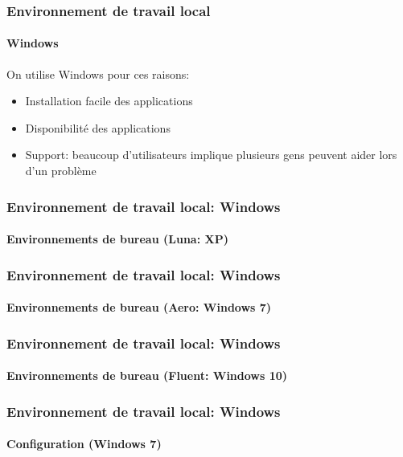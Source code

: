\documentclass[xcolor=table]{beamer}
\begin{document}
\begin{frame}
\frametitle{Environnement de travail local}
\framesubtitle{Windows}

On utilise Windows pour ces raisons:
\begin{itemize}
	\item Installation facile des applications
	\item Disponibilité des applications 
	\item Support: beaucoup d'utilisateurs implique plusieurs gens peuvent aider lors d'un problème
\end{itemize}

\end{frame}

\begin{frame}
\frametitle{Environnement de travail local: Windows}
\framesubtitle{Environnements de bureau (Luna: XP)}

\begin{center}
\end{center}

\end{frame}

\begin{frame}
\frametitle{Environnement de travail local: Windows}
\framesubtitle{Environnements de bureau (Aero: Windows 7)}

\begin{center}
\end{center}

\end{frame}

\begin{frame}
\frametitle{Environnement de travail local: Windows}
\framesubtitle{Environnements de bureau (Fluent: Windows 10)}

\begin{center}
\end{center}

\end{frame}

\begin{frame}
\frametitle{Environnement de travail local: Windows}
\framesubtitle{Configuration (Windows 7)}

\begin{center}
\end{center}

\end{frame}
\end{document}
